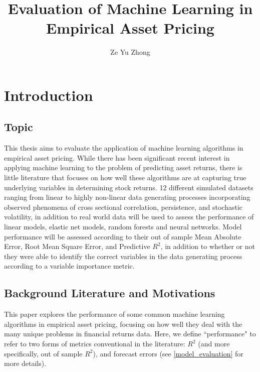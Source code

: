 \documentclass[11pt, a4paper, table]{article}
\title{Evaluation of Machine Learning in Empirical Asset Pricing}
\author{Ze Yu Zhong}
\begin{document}
\maketitle

\tableofcontents

\newpage


\section{Introduction}

\subsection{Topic}

This thesis aims to evaluate the application of machine learning algorithms in empirical asset pricing. While there has been significant recent interest in applying machine learning to the problem of predicting asset returns, there is little literature that focuses on how well these algorithms are at capturing true underlying variables in determining stock returns. 12 different simulated datasets ranging from linear to highly non-linear data generating processes incorporating observed phenomena of cross sectional correlation, persistence, and stochastic volatility, in addition to real world data will be used to assess the performance of linear models, elastic net models, random forests and neural networks. Model performance will be assessed according to their out of sample Mean Absolute Error, Root Mean Square Error, and Predictive $R^2$, in addition to whether or not they were able to identify the correct variables in the data generating process according to a variable importance metric.

\subsection{Background Literature and Motivations}

This paper explores the performance of some common machine learning algorithms in empirical asset pricing, focusing on how well they deal with the many unique problems in financial returns data. Here, we define ``performance" to refer to two forms of metrics conventional in the literature: $R^2$ (and more specifically, out of sample $R^2$), and forecast errors (see \ref{model_evaluation} for more details).
\end{document}
